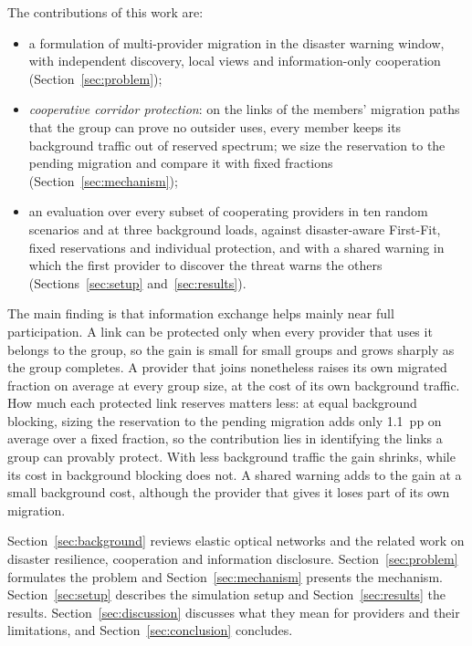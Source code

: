 \documentclass[11pt,a4paper]{article}
\theoremstyle{definition}
\begin{document}
The contributions of this work are:
\begin{itemize}[leftmargin=1.2em]
  \item a formulation of multi-provider migration in the disaster warning window, with independent discovery, local views and information-only cooperation (Section~\ref{sec:problem});
  \item \emph{cooperative corridor protection}: on the links of the members' migration paths that the group can prove no outsider uses, every member keeps its background traffic out of reserved spectrum; we size the reservation to the pending migration and compare it with fixed fractions (Section~\ref{sec:mechanism});
  \item an evaluation over every subset of cooperating providers in ten random scenarios and at three background loads, against disaster-aware First-Fit, fixed reservations and individual protection, and with a shared warning in which the first provider to discover the threat warns the others (Sections~\ref{sec:setup} and~\ref{sec:results}).
\end{itemize}
The main finding is that information exchange helps mainly near full participation.
A link can be protected only when every provider that uses it belongs to the group, so the gain is small for small groups and grows sharply as the group completes.
A provider that joins nonetheless raises its own migrated fraction on average at every group size, at the cost of its own background traffic.
How much each protected link reserves matters less: at equal background blocking, sizing the reservation to the pending migration adds only 1.1~pp on average over a fixed fraction, so the contribution lies in identifying the links a group can provably protect.
With less background traffic the gain shrinks, while its cost in background blocking does not.
A shared warning adds to the gain at a small background cost, although the provider that gives it loses part of its own migration.

Section~\ref{sec:background} reviews elastic optical networks and the related work on disaster resilience, cooperation and information disclosure.
Section~\ref{sec:problem} formulates the problem and Section~\ref{sec:mechanism} presents the mechanism.
Section~\ref{sec:setup} describes the simulation setup and Section~\ref{sec:results} the results.
Section~\ref{sec:discussion} discusses what they mean for providers and their limitations, and Section~\ref{sec:conclusion} concludes.

\end{document}
